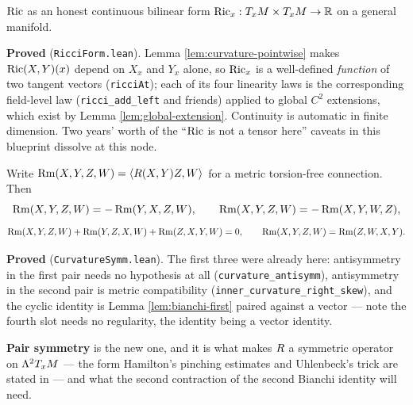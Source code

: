 \begin{definition}
  \label{def:ricci-form}
  \leanok
  $\operatorname{Ric}$ as an honest continuous bilinear form $\operatorname{Ric}_x : T_xM \times T_xM \to
  \mathbb{R}$ on a general manifold.

  \textbf{Proved} (\texttt{RicciForm.lean}). Lemma
  \ref{lem:curvature-pointwise} makes $\operatorname{Ric}(X,Y)(x)$ depend on $X_x$ and $Y_x$
  alone, so $\operatorname{Ric}_x$ is a well-defined \emph{function} of two tangent vectors
  (\texttt{ricciAt}); each of its four linearity laws is the corresponding
  field-level law (\texttt{ricci\_add\_left} and friends) applied to global
  $C^2$ extensions, which exist by Lemma \ref{lem:global-extension}.
  Continuity is automatic in finite dimension. Two years' worth of the
  ``$\operatorname{Ric}$ is not a tensor here'' caveats in this blueprint dissolve at this
  node.
\end{definition}

\begin{lemma}
  \label{lem:curvature-symmetries}
  \leanok
  Write $\operatorname{Rm}(X,Y,Z,W) = \langle R(X,Y)Z, W\rangle$ for a metric torsion-free
  connection. Then
  \[
    \operatorname{Rm}(X,Y,Z,W) = -\operatorname{Rm}(Y,X,Z,W), \qquad
    \operatorname{Rm}(X,Y,Z,W) = -\operatorname{Rm}(X,Y,W,Z),
  \]
  \[
    \operatorname{Rm}(X,Y,Z,W) + \operatorname{Rm}(Y,Z,X,W) + \operatorname{Rm}(Z,X,Y,W) = 0, \qquad
    \operatorname{Rm}(X,Y,Z,W) = \operatorname{Rm}(Z,W,X,Y).
  \]

  \textbf{Proved} (\texttt{CurvatureSymm.lean}). The first three were already
  here: antisymmetry in the first pair needs no hypothesis at all
  (\texttt{curvature\_antisymm}), antisymmetry in the second pair is metric
  compatibility (\texttt{inner\_curvature\_right\_skew}), and the cyclic
  identity is Lemma \ref{lem:bianchi-first} paired against a vector --- note the
  fourth slot needs no regularity, the identity being a vector identity.

  \textbf{Pair symmetry} is the new one, and it is what makes $R$ a
  symmetric operator on $\Lambda^2 T_xM$ --- the form Hamilton's pinching
  estimates and Uhlenbeck's trick are stated in --- and what the second
  contraction of the second Bianchi identity will need.
\end{lemma}

